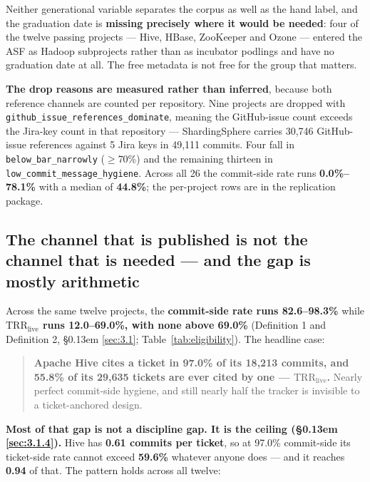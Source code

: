 \documentclass[sigconf,review,anonymous]{acmart}
\begin{document}
Neither generational variable separates the corpus as well as the hand label, and the graduation date is \textbf{missing precisely where it would be needed}: four of the twelve passing projects --- Hive, HBase, ZooKeeper and Ozone --- entered the ASF as Hadoop subprojects rather than as incubator podlings and have no graduation date at all. The free metadata is not free for the group that matters.

\textbf{The drop reasons are measured rather than inferred}, because both reference channels are counted per repository. Nine projects are dropped with \texttt{github\_\allowbreak{}issue\_\allowbreak{}references\_\allowbreak{}dominate}, meaning the GitHub-issue count exceeds the Jira-key count in that repository --- ShardingSphere carries 30,746 GitHub-issue references against 5 Jira keys in 49,111 commits. Four fall in \texttt{below\_\allowbreak{}bar\_\allowbreak{}narrowly} ($\geq$70\%) and the remaining thirteen in \texttt{low\_\allowbreak{}commit\_\allowbreak{}message\_\allowbreak{}hygiene}. Across all 26 the commit-side rate runs \textbf{0.0\%--78.1\%} with a median of \textbf{44.8\%}; the per-project rows are in the replication package.

\subsection{The channel that is published is not the channel that is needed --- and the gap is mostly arithmetic}
\label{sec:4.2}

Across the same twelve projects, the \textbf{commit-side rate runs 82.6--98.3\%} while \textbf{$\mathrm{TRR}_\mathrm{live}$ runs 12.0--69.0\%, with none above 69.0\%} (Definition 1 and Definition 2, \S\kern0.13em \ref{sec:3.1}; Table~\ref{tab:eligibility}). The headline case:

\begin{quote}
\textbf{Apache Hive cites a ticket in 97.0\% of its 18,213 commits, and 55.8\% of its 29,635 tickets are ever cited by one --- $\mathrm{TRR}_\mathrm{live}$.} Nearly perfect commit-side hygiene, and still nearly half the tracker is invisible to a ticket-anchored design.

\end{quote}

\textbf{Most of that gap is not a discipline gap. It is the ceiling (\S\kern0.13em \ref{sec:3.1.4}).} Hive has \textbf{0.61 commits per ticket}, so at 97.0\% commit-side its ticket-side rate cannot exceed \textbf{59.6\%} whatever anyone does --- and it reaches \textbf{0.94} of that. The pattern holds across all twelve:
\end{document}
